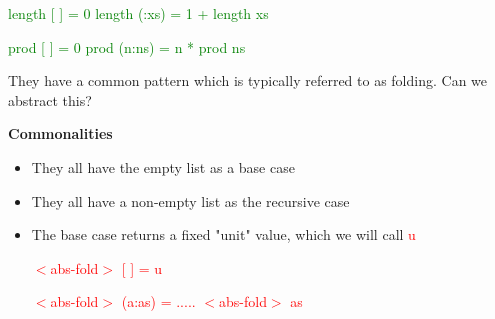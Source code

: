 \documentclass{article}
\begin{document}
\textcolor{green}{length [ ] = 0}
\textcolor{green}{length (\textunderscore:xs) = 1 + length xs}

\textcolor{green}{prod [ ] = 0}
\textcolor{green}{prod (n:ns) = n * prod ns}

They have a common pattern which is typically referred to as folding. Can we abstract this?

\textbf{Commonalities}

\begin{itemize}
\item They all have the empty list as a base case
\item They all have a non-empty list as the recursive case
\item The base case returns a fixed "unit" value, which we will call \textcolor{red}{u}

\textcolor{red}{$<$abs-fold$>$ [ ] = u}

\textcolor{red}{$<$abs-fold$>$ (a:as) = ..... $<$abs-fold$>$ as}

\end{itemize}
\end{document}
